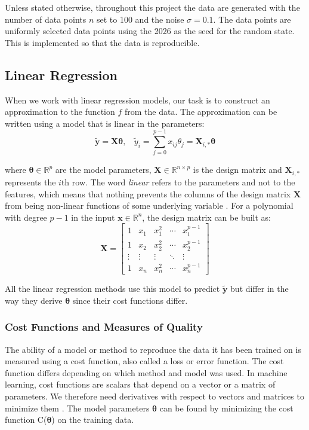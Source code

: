 \documentclass[reprint,english,notitlepage]{revtex4-2}  %
\begin{document}
Unless stated otherwise, throughout this project the data are generated with the number of data points $n$ set to 100 and the noise $\sigma = 0.1$. The data points are uniformly selected data points using the 2026 as the seed for the random state. This is implemented so that the data is reproducible.

\subsection{Linear Regression}

When we work with linear regression models, our task is to construct an approximation to the function $f$ from the data. The approximation can be written using a model that is linear in the parameters:
\begin{equation}\label{eq:ytilde}
    \bm{\tilde{y}} = \bm{X\theta}, \ \ \ \ \tilde{y}_i = \sum_{j=0}^{p-1} x_{ij}\theta_j = \bm{X}_{i,*} \bm{\theta}
\end{equation}

where $\bm{\theta} \in \mathbb{R}^p$ are the model parameters, $\bm{X} \in \mathbb{R}^{n \times p}$ is the design matrix and $\bm{X}_{i,*}$ represents the $i$th row. The word \emph{linear} refers to the parameters and not to the features, which means that nothing prevents the columns of the design matrix $\bm{X}$ from being non-linear functions of some underlying variable \cite{lecture_book}. For a polynomial with degree $p-1$  in the input 
$\bm{x} \in \mathbb{R}^n$, the design matrix can be built as:
\[
\bm{X}=
\begin{bmatrix}
1 & x_1 & x_1^2 & \cdots & x_1^{p-1}\\
1 & x_2 & x_2^2 & \cdots & x_2^{p-1}\\
\vdots & \vdots & \vdots & \ddots & \vdots\\
1 & x_n & x_n^2 & \cdots & x_n^{p-1}
\end{bmatrix}
\] 

All the linear regression methods use this model to predict $\bm{\tilde{y}}$ but differ in the way they derive $\bm{\theta}$ since their cost functions differ.

\subsubsection{Cost Functions and Measures of Quality}\label{subsec:Cost_func}

The ability of a model or method to reproduce the data it has been trained on is measured using a cost function, also called a loss or error function. 
The cost function differs depending on which method and model was used. In machine learning, cost functions are scalars that depend on a vector or a matrix of parameters. We therefore need derivatives with respect to vectors and matrices to minimize them \cite{lecture_book}. The model parameters $\bm{\theta}$ can be found by minimizing the cost function C($\bm{\theta}$) on the training data. 
\end{document}
